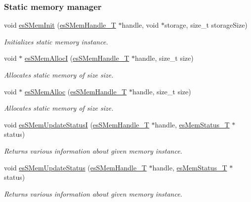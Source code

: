 \subsubsection*{Static memory manager}
\begin{DoxyCompactItemize}
\item 
void \hyperlink{group__mem__intf_ga53acef4ba27e5e401ac2e1f862e07a8b}{es\-S\-Mem\-Init} (\hyperlink{group__mem__intf_gabf19a317cc22713cfb45ae1e43d34d7e}{es\-S\-Mem\-Handle\-\_\-\-T} $\ast$handle, void $\ast$storage, size\-\_\-t storage\-Size)
\begin{DoxyCompactList}\small\item\em Initializes static memory instance. \end{DoxyCompactList}\item 
void $\ast$ \hyperlink{group__mem__intf_ga2e2086778aa0eb21156044730a1f380b}{es\-S\-Mem\-Alloc\-I} (\hyperlink{group__mem__intf_gabf19a317cc22713cfb45ae1e43d34d7e}{es\-S\-Mem\-Handle\-\_\-\-T} $\ast$handle, size\-\_\-t size)
\begin{DoxyCompactList}\small\item\em Allocates static memory of size {\ttfamily size}. \end{DoxyCompactList}\item 
void $\ast$ \hyperlink{group__mem__intf_ga23c0a40e0c40dabed8c22d9d65709c65}{es\-S\-Mem\-Alloc} (\hyperlink{group__mem__intf_gabf19a317cc22713cfb45ae1e43d34d7e}{es\-S\-Mem\-Handle\-\_\-\-T} $\ast$handle, size\-\_\-t size)
\begin{DoxyCompactList}\small\item\em Allocates static memory of size {\ttfamily size}. \end{DoxyCompactList}\item 
void \hyperlink{group__mem__intf_ga87b817ce71357521c4cd43a9cb587201}{es\-S\-Mem\-Update\-Status\-I} (\hyperlink{group__mem__intf_gabf19a317cc22713cfb45ae1e43d34d7e}{es\-S\-Mem\-Handle\-\_\-\-T} $\ast$handle, \hyperlink{group__mem__intf_ga0eb568b68247d93e2db804a681de0e9e}{es\-Mem\-Status\-\_\-\-T} $\ast$status)
\begin{DoxyCompactList}\small\item\em Returns various information about given memory instance. \end{DoxyCompactList}\item 
void \hyperlink{group__mem__intf_gac0ad18ef5c9332358a4d0a5ded270f34}{es\-S\-Mem\-Update\-Status} (\hyperlink{group__mem__intf_gabf19a317cc22713cfb45ae1e43d34d7e}{es\-S\-Mem\-Handle\-\_\-\-T} $\ast$handle, \hyperlink{group__mem__intf_ga0eb568b68247d93e2db804a681de0e9e}{es\-Mem\-Status\-\_\-\-T} $\ast$status)
\begin{DoxyCompactList}\small\item\em Returns various information about given memory instance. \end{DoxyCompactList}\end{DoxyCompactItemize}
